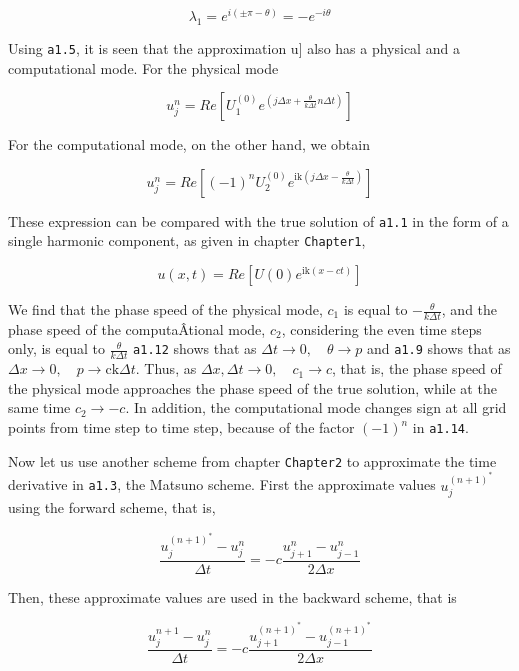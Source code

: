 \[\lambda_{1} = e^{i\left( \pm\pi-\theta\right)} = - e^{- i\theta}\]

Using \texttt{a1.5}, it is seen that the approximation u{]} also has a
physical and a computational mode. For the physical mode

 {\[u_{j}^{n} = Re\left\lbrack U_{1}^{\left( 0 \right)}e^{\left( j\Delta x
+ \frac{\theta}{k\Delta t}n\Delta t \right)} \right\rbrack\]}

For the computational mode, on the other hand, we obtain

 {\[u_{j}^{n} = Re\left\lbrack \left( - 1 \right)^{n}U_{2}^{\left( 0 \right)}
e^{\text{ik}\left( j\Delta x - \frac{\theta}{k\Delta t} \right)} \right\rbrack\]}

These expression can be compared with the true solution of \texttt{a1.1}
in the form of a single harmonic component, as given in chapter
\texttt{Chapter1},

 {\[u\left( x,t \right) = Re\left\lbrack U\left( 0 \right)e^{\text{ik}
\left( x - c t \right)} \right\rbrack\]}

We find that the phase speed of the physical mode, \(c_{1}\) is equal to
\(- \frac{\theta}{k\Delta t}\), and the phase speed of the
computaÂ­tional mode, \(c_{2}\), considering the even time steps only, is
equal to \(\frac{\theta}{k\Delta t}\) \texttt{a1.12} shows that as
\(\Delta t \rightarrow 0, \quad \theta \rightarrow p\) and \texttt{a1.9}
shows that as
\(\Delta x \rightarrow 0, \quad p  \rightarrow \text{ck}\Delta t\).
Thus, as \(\Delta x,\Delta t \rightarrow 0, \quad c_{1} \rightarrow c\),
that is, the phase speed of the physical mode approaches the phase speed
of the true solution, while at the same time \(c_{2} \rightarrow - c\).
In addition, the computational mode changes sign at all grid points
from time step to time step, because of the factor
\(\left( - 1 \right)^{n}\) in \texttt{a1.14}.

Now let us use another scheme from chapter \texttt{Chapter2} to
approximate the time derivative in \texttt{a1.3}, the Matsuno scheme.
First the approximate values \(u_{j}^{\left( n + 1 \right)^{*}}\) using
the forward scheme, that is,

 {\[\frac{u_{j}^{\left( n + 1 \right)^{*}} - u_{j}^{n}}{\Delta t}
= - c\frac{u_{j + 1}^{n} - u_{j - 1}^{n}}{2\Delta x}\]}

Then, these approximate values are used in the backward scheme, that is

 {\[\frac{u_{j}^{n + 1} - u_{j}^{n}}{\Delta t} =
- c\frac{u_{j + 1}^{\left( n + 1 \right)^{*}} - u_{j - 1}^{\left( n + 1 \right)^{*}}}{2\Delta x}\]}

